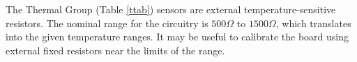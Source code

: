 \documentclass[12pt]{article}
\begin{document}
The Thermal Group (Table \ref{ttab}) sensors are external temperature-sensitive resistors. The nominal range for the circuitry is $500\Omega$ to $1500\Omega$, which translates into the given temperature ranges. It may be useful to calibrate the board using external fixed resistors near the limits of the range.
\end{document}
